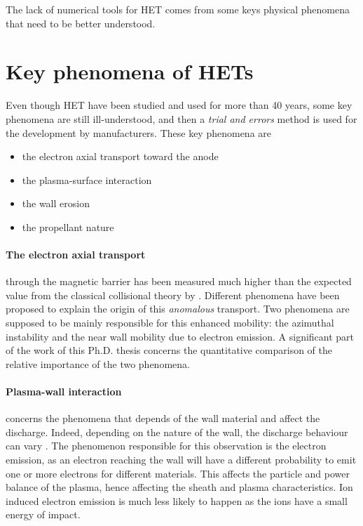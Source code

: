 The lack of numerical tools for \ac{HET}  comes from some keys physical phenomena that need to be better understood.


\section*{Key phenomena of \ac{HET}s}

Even though \ac{HET} have been studied and used for more than 40 years, some key phenomena are still ill-understood, and then a \emph{trial and errors} method is used for the development by manufacturers.
These key phenomena are
\begin{itemize}
  \item the electron axial transport toward the anode
  \item the plasma-surface interaction 
  \item the wall erosion
  \item the propellant nature
\end{itemize}


\paragraph{The electron axial transport}  through the magnetic barrier has been measured much higher than the expected value from the classical collisional theory by \citet{meezan2001}.
Different phenomena have been proposed to explain the origin of this \emph{anomalous} transport.
Two phenomena are supposed to be mainly responsible for this enhanced mobility\string: the azimuthal instability and the near wall mobility due to electron emission.
A significant part of the work of this Ph.D. thesis concerns the quantitative comparison of the relative importance of the two phenomena.

\paragraph{Plasma-wall interaction} concerns the phenomena that depends of the wall material and affect the discharge.
Indeed, depending on the nature of the wall, the discharge behaviour can vary \citep{gascon2003}.
The phenomenon responsible for this observation is the electron emission, as an electron reaching the wall will have a different probability to emit one or more electrons for different materials.
This affects the particle and power balance of the plasma, hence affecting the sheath and plasma characteristics.
Ion induced electron emission is much less likely to happen as the ions have a small energy of impact.

